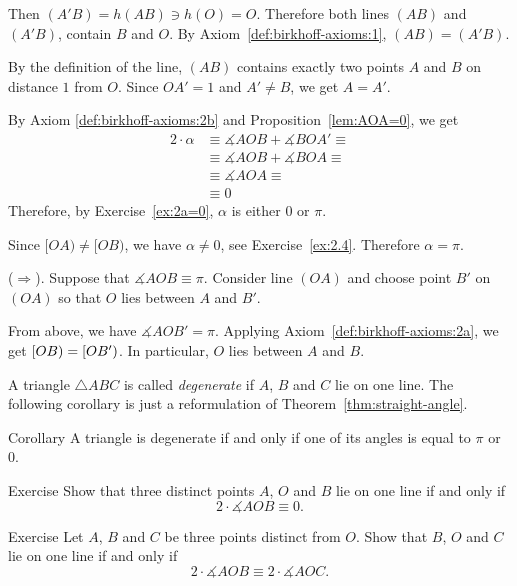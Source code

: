 Then $(A'B)=h(AB)\ni h(O)=O$.
Therefore both lines $(AB)$ and $(A'B)$, 
 contain $B$ and $O$.
By Axiom~\ref{def:birkhoff-axioms:1}, $(AB)=(A'B)$.

By the definition of the line,
$(AB)$ contains exactly two points $A$ and $B$ on distance $1$ from $O$.
Since $OA'=1$ and $A'\ne B$, we get $A=A'$.

By Axiom \ref{def:birkhoff-axioms:2b} and Proposition~\ref{lem:AOA=0}, we get
\begin{align*}
2\cdot\alpha&\equiv
\measuredangle AOB+\measuredangle BOA'\equiv
\\
&\equiv\measuredangle AOB+\measuredangle BOA\equiv
\\
&\equiv\measuredangle AOA\equiv
\\
&\equiv 0
\end{align*}
Therefore, by Exercise~\ref{ex:2a=0}, $\alpha$ is either $0$ or $\pi$.

Since $[OA)\ne [OB)$,  
we have $\alpha\ne 0$, see Exercise~\ref{ex:2.4}.
Therefore $\alpha=\pi$.


\parit{}($\Rightarrow$).
Suppose that $\measuredangle A O B\equiv \pi$.
Consider line $(OA)$ and choose point $B'$ on $(OA)$ so that $O$ lies between $A$ and $B'$.

From above, we have $\measuredangle AOB'=\pi$.
Applying Axiom~\ref{def:birkhoff-axioms:2a}, 
we get $[O B)\z=[O B')$.
In particular, $O$ lies between $A$ and $B$.
\qeds 

A triangle $\triangle ABC$ is called 
\emph{degenerate}
if $A$, $B$ and $C$ lie on one line.
The following corollary is just a reformulation of Theorem~\ref{thm:straight-angle}.

\begin{thm}{Corollary}\label{cor:degenerate=pi}
A triangle is degenerate if and only if one of its angles is equal to $\pi$ or $0$.
\end{thm}

\begin{thm}{Exercise}\label{ex:lineAOB}
Show that three distinct points $A$, $O$ and $B$ lie on one line if and only if 
$$2\cdot \measuredangle AOB\equiv 0.$$ 

\end{thm}

\begin{thm}{Exercise}\label{ex:ABCO-line}
Let $A$, $B$ and $C$ be three points distinct from $O$.
Show that $B$, $O$ and $C$ lie on one line if and only if
$$2\cdot \measuredangle AOB\equiv 2\cdot \measuredangle AOC.$$ 

\end{thm}



